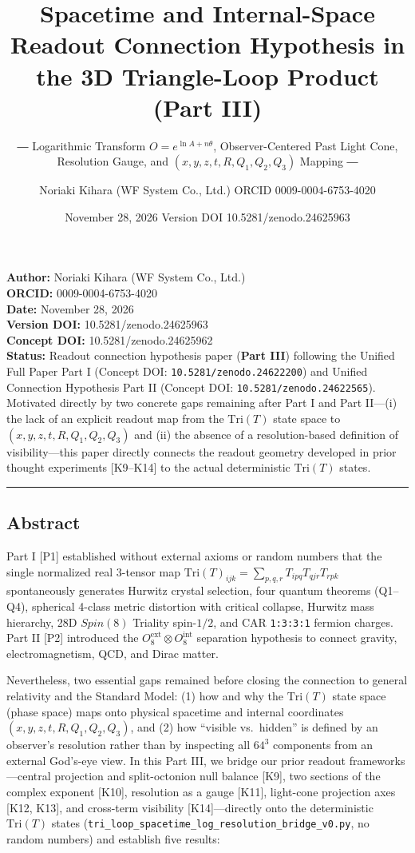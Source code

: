 \documentclass[
  a4paper,
]{article}
\title{Spacetime and Internal-Space Readout Connection Hypothesis in the
3D Triangle-Loop Product (Part III)}
\subtitle{― Logarithmic Transform \(O = e^{\ln A + n\theta}\),
Observer-Centered Past Light Cone, Resolution Gauge, and
\((x, y, z, t, R, Q_1, Q_2, Q_3)\) Mapping ―}
\author{Noriaki Kihara (WF System Co., Ltd.) ORCID 0009-0004-6753-4020}
\date{November 28, 2026 Version DOI 10.5281/zenodo.24625963}
\begin{document}
\maketitle

{
\setcounter{tocdepth}{2}
\tableofcontents
}
\textbf{Author:} Noriaki Kihara (WF System Co., Ltd.)\\
\textbf{ORCID:} 0009-0004-6753-4020\\
\textbf{Date:} November 28, 2026\\
\textbf{Version DOI:} 10.5281/zenodo.24625963\\
\textbf{Concept DOI:} 10.5281/zenodo.24625962\\
\textbf{Status:} Readout connection hypothesis paper (\textbf{Part III})
following the Unified Full Paper Part I (Concept DOI:
\texttt{10.5281/zenodo.24622200}) and Unified Connection Hypothesis Part
II (Concept DOI: \texttt{10.5281/zenodo.24622565}). Motivated directly
by two concrete gaps remaining after Part I and Part II---(i) the lack
of an explicit readout map from the \(\mathrm{Tri}(T)\) state space to
\((x, y, z, t, R, Q_1, Q_2, Q_3)\) and (ii) the absence of a
resolution-based definition of visibility---this paper directly connects
the readout geometry developed in prior thought experiments
{[}K9--K14{]} to the actual deterministic \(\mathrm{Tri}(T)\) states.

\begin{center}\rule{0.5\linewidth}{0.5pt}\end{center}

\subsection{Abstract}\label{abstract}

Part I {[}P1{]} established without external axioms or random numbers
that the single normalized real 3-tensor map
\(\mathrm{Tri}(T)_{ijk} = \sum_{p,q,r} T_{ipq} T_{qjr} T_{rpk}\)
spontaneously generates Hurwitz crystal selection, four quantum theorems
(Q1--Q4), spherical 4-class metric distortion with critical collapse,
Hurwitz mass hierarchy, 28D \(Spin(8)\) Triality spin-\(1/2\), and CAR
\texttt{1:3:3:1} fermion charges. Part II {[}P2{]} introduced the
\(O_8^{\mathrm{ext}} \otimes O_8^{\mathrm{int}}\) separation hypothesis
to connect gravity, electromagnetism, QCD, and Dirac matter.

Nevertheless, two essential gaps remained before closing the connection
to general relativity and the Standard Model: (1) how and why the
\(\mathrm{Tri}(T)\) state space (phase space) maps onto physical
spacetime and internal coordinates \((x, y, z, t, R, Q_1, Q_2, Q_3)\),
and (2) how ``visible vs.~hidden'' is defined by an observer's
resolution rather than by inspecting all \(64^3\) components from an
external God's-eye view. In this Part III, we bridge our prior readout
frameworks---central projection and split-octonion null balance
{[}K9{]}, two sections of the complex exponent {[}K10{]}, resolution as
a gauge {[}K11{]}, light-cone projection axes {[}K12, K13{]}, and
cross-term visibility {[}K14{]}---directly onto the deterministic
\(\mathrm{Tri}(T)\) states
(\texttt{tri\_loop\_spacetime\_log\_resolution\_bridge\_v0.py}, no
random numbers) and establish five results:
\end{document}
